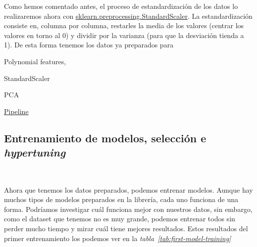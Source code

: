 Como hemos comentado antes, el proceso de estandardización de los datos lo realizaremos ahora con \href{https://scikit-learn.org/stable/modules/generated/sklearn.preprocessing.StandardScaler.html}{sklearn.preprocessing.StandardScaler}. La estandardización consiste en, columna por columna, restarles la media de los valores (centrar los valores en torno al 0) y dividir por la varianza (para que la desviación tienda a 1). De esta forma tenemos los datos ya preparados para 




Polynomial features,

StandardScaler

PCA




\href{https://scikit-learn.org/stable/modules/generated/sklearn.pipeline.Pipeline.html}{Pipeline}


\subsection{Entrenamiento de modelos, selección e \textit{hypertuning}}\ \label{sec:entrenamiento}

Ahora que tenemos los datos preparados, podemos entrenar modelos. Aunque hay muchos tipos de modelos preparados en la librería, cada uno funciona de una forma. Podríamos investigar cuál funciona mejor con nuestros datos, sin embargo, como el \gls{dataset} que tenemos no es muy grande, podemos entrenar todos sin perder mucho tiempo y mirar cuál tiene mejores resultados. Estos resultados del primer entrenamiento los podemos ver en la \textit{tabla\ \ref{tab:first-model-training}}

